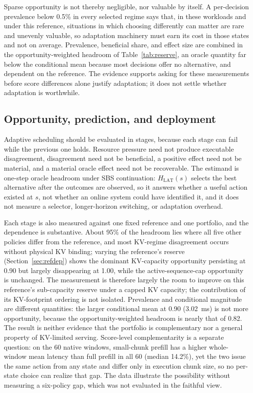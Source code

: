 \documentclass[preprint,12pt]{elsarticle}
\begin{document}
Sparse opportunity is not thereby negligible, nor valuable by itself. A
per-decision prevalence below 0.5\% in every selected regime says that, in these
workloads and under this reference, situations in which choosing differently can
matter are rare and unevenly valuable, so adaptation machinery must earn its cost
in those states and not on average. Prevalence, beneficial share, and effect size
are combined in the opportunity-weighted headroom of
Table~\ref{tab:reserve}, an oracle quantity far below the conditional mean
because most decisions offer no alternative, and dependent on the reference. The
evidence supports asking for these measurements before score differences alone
justify adaptation; it does not settle whether adaptation is worthwhile.

\subsection{Opportunity, prediction, and deployment}
Adaptive scheduling should be evaluated in stages, because each stage can fail
while the previous one holds. Resource pressure need not produce executable
disagreement, disagreement need not be beneficial, a positive effect need not be
material, and a material oracle effect need not be recoverable.
The estimand is one-step oracle headroom under SBS continuation:
$H_{\mathrm{LAT}}(s)$ selects the best alternative after the outcomes are
observed, so it answers whether a useful action existed at $s$, not whether an
online system could have identified it, and it does not measure a selector,
longer-horizon switching, or adaptation overhead.

Each stage is also measured against one fixed reference and one portfolio, and
the dependence is substantive. About 95\% of the headroom lies where all five
other policies differ from the reference, and most KV-regime disagreement occurs
without physical KV binding; varying the reference's reserve
(Section~\ref{sec:refdep}) shows the dominant KV-capacity opportunity persisting
at 0.90 but largely disappearing at 1.00, while the active-sequence-cap
opportunity is unchanged. The measurement is therefore largely the room to
improve on this reference's sub-capacity reserve under a capped KV capacity; the
contribution of its KV-footprint ordering is not isolated. Prevalence and
conditional magnitude are different quantities: the larger conditional mean at
0.90 (3.02~ms) is not more opportunity, because the opportunity-weighted headroom
is nearly that of 0.82. The result is neither
evidence that the portfolio is complementary nor a general property of
KV-limited serving. Score-level complementarity is a separate question: on
the 60 native windows, small-chunk prefill has a higher whole-window mean
latency than full prefill in all 60 (median 14.2\%), yet the two issue the same
action from any state and differ only in execution chunk size, so no per-state
choice can realize that gap. The data illustrate the possibility without
measuring a six-policy gap, which was not evaluated in the faithful view.
\end{document}
